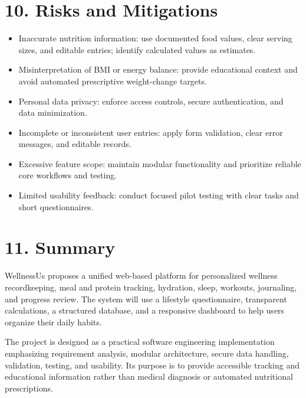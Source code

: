 \documentclass[11pt,a4paper]{article}
\begin{document}
\section*{10. Risks and Mitigations}
\begin{itemize}
\item Inaccurate nutrition information: use documented food values, clear serving sizes, and editable entries; identify calculated values as estimates.
\item Misinterpretation of BMI or energy balance: provide educational context and avoid automated prescriptive weight-change targets.
\item Personal data privacy: enforce access controls, secure authentication, and data minimization.
\item Incomplete or inconsistent user entries: apply form validation, clear error messages, and editable records.
\item Excessive feature scope: maintain modular functionality and prioritize reliable core workflows and testing.
\item Limited usability feedback: conduct focused pilot testing with clear tasks and short questionnaires.
\end{itemize}
\section*{11. Summary}
WellnessUs proposes a unified web-based platform for personalized wellness recordkeeping, meal and protein tracking, hydration, sleep, workouts, journaling, and progress review. The system will use a lifestyle questionnaire, transparent calculations, a structured database, and a responsive dashboard to help users organize their daily habits.

The project is designed as a practical software engineering implementation emphasizing requirement analysis, modular architecture, secure data handling, validation, testing, and usability. Its purpose is to provide accessible tracking and educational information rather than medical diagnosis or automated nutritional prescriptions.
\end{document}
